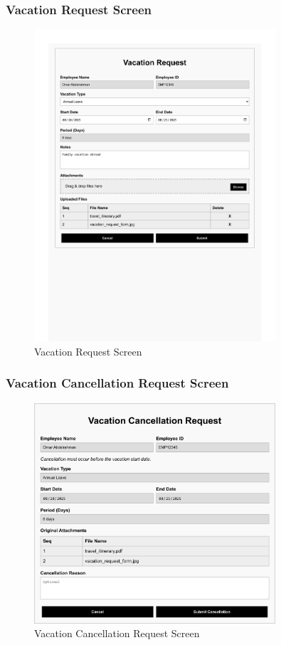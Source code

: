 \documentclass[12pt,a4paper]{article}
\begin{document}
\subsubsection{Vacation Request Screen}
\begin{figure}[H]
\centering
\includegraphics[width=0.8\textwidth]{Wireframes/Vacation-Request/Vacation-Request-1.png}
\caption{Vacation Request Screen}
\label{fig:vacation-request-screen}
\end{figure}

\subsubsection{Vacation Cancellation Request Screen}
\begin{figure}[H]
\centering
\includegraphics[width=0.8\textwidth]{Wireframes/Vacation-Cancellation-Request/Vacation-Cancellation-Request-1.png}
\caption{Vacation Cancellation Request Screen}
\label{fig:vacation-cancellation-screen}
\end{figure}
\end{document}
